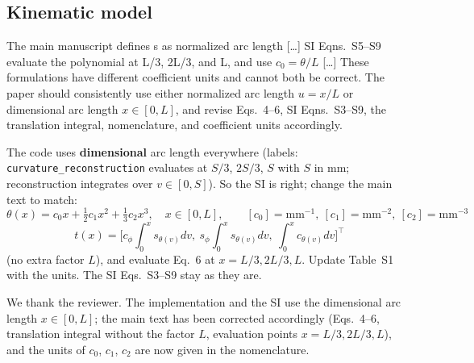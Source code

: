 \documentclass[10pt,a4paper]{article}
\begin{document}
\subsection{Kinematic model}\label{sec:model}
\begin{rev}
The main manuscript defines s as normalized arc length [\dots] SI Eqns.~S5--S9 evaluate the polynomial at L/3, 2L/3, and L, and use $c_0=\theta/L$ [\dots] These formulations have different coefficient units and cannot both be correct. The paper should consistently use either normalized arc length $u=x/L$ or dimensional arc length $x\in[0,L]$, and revise Eqs.~4--6, SI Eqns.~S3--S9, the translation integral, nomenclature, and coefficient units accordingly.
\end{rev}
\begin{todo}
The code uses \textbf{dimensional} arc length everywhere (labels: \texttt{curvature\_reconstruction} evaluates at $S/3$, $2S/3$, $S$ with $S$ in mm; reconstruction integrates over $v\in[0,S]$). So the SI is right; change the main text to match:
\[\theta(x)=c_0x+\tfrac12c_1x^2+\tfrac13c_2x^3,\quad x\in[0,L],\qquad [c_0]=\text{mm}^{-1},\ [c_1]=\text{mm}^{-2},\ [c_2]=\text{mm}^{-3}\]
\[t(x)=\Big[c_\phi\!\int_0^x\! s_{\theta(v)}dv,\ s_\phi\!\int_0^x\! s_{\theta(v)}dv,\ \int_0^x\! c_{\theta(v)}dv\Big]^\top\]
(no extra factor $L$), and evaluate Eq.~6 at $x=L/3,2L/3,L$. Update Table~S1 with the units. The SI Eqs.~S3--S9 stay as they are.
\end{todo}
\begin{resp}
We thank the reviewer. The implementation and the SI use the dimensional arc length $x\in[0,L]$; the main text has been corrected accordingly (Eqs.~4--6, translation integral without the factor $L$, evaluation points $x=L/3,2L/3,L$), and the units of $c_0$, $c_1$, $c_2$ are now given in the nomenclature.
\end{resp}
\end{document}
